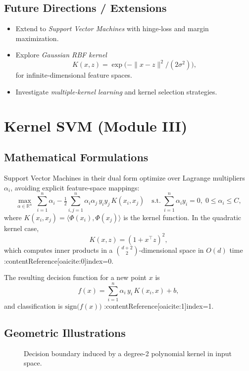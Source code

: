 \documentclass[11pt]{article}
\begin{document}
\subsection{Future Directions / Extensions}
\begin{itemize}
  \item Extend to \emph{Support Vector Machines} with hinge‐loss and margin maximization.
  \item Explore \emph{Gaussian RBF kernel} 
  \[
    K(x,z) = \exp\bigl(-\|x-z\|^2/(2\sigma^2)\bigr),
  \]
  for infinite‐dimensional feature spaces.
  \item Investigate \emph{multiple‐kernel learning} and kernel selection strategies.
\end{itemize}

\section{Kernel SVM (Module III)}

\subsection{Mathematical Formulations}
Support Vector Machines in their dual form optimize over Lagrange multipliers $\alpha_i$, avoiding explicit feature‐space mappings:
\[
\max_{\alpha\in\mathbb{R}^n}\;\sum_{i=1}^n \alpha_i
-\tfrac{1}{2}\sum_{i,j=1}^n \alpha_i\alpha_j\,y_i y_j\,K(x_i,x_j)
\quad\text{s.t.}\;\sum_{i=1}^n \alpha_i y_i = 0,\;0\le \alpha_i\le C,
\]
where $K(x_i,x_j)=\langle\Phi(x_i),\Phi(x_j)\rangle$ is the kernel function.  In the quadratic kernel case,
\[
K(x,z)=(1 + x^\top z)^2,
\]
which computes inner products in a $\binom{d+2}{2}$-dimensional space in $O(d)$ time :contentReference[oaicite:0]{index=0}.

The resulting decision function for a new point $x$ is
\[
f(x)=\sum_{i=1}^n \alpha_i\,y_i\,K(x_i,x) + b,
\]
and classification is $\mathrm{sign}\bigl(f(x)\bigr)$ :contentReference[oaicite:1]{index=1}.

\subsection{Geometric Illustrations}
\begin{figure}[h]
  \centering
  \caption{Decision boundary induced by a degree-2 polynomial kernel in input space.}
\end{figure}
\end{document}
